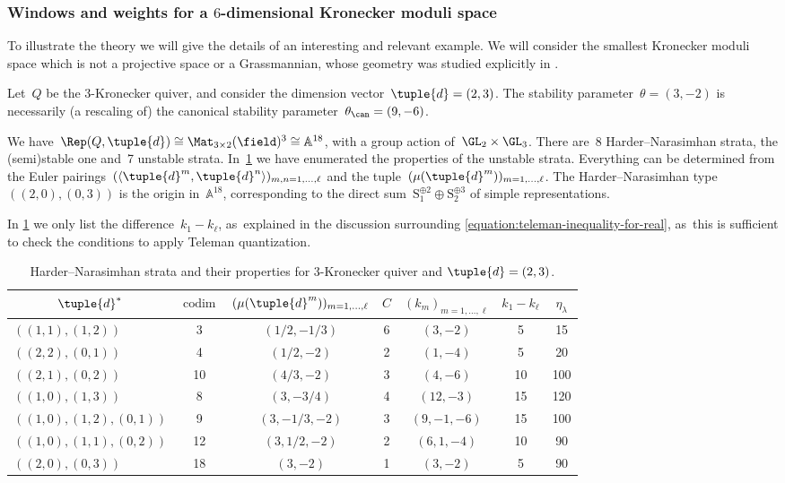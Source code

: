 \subsubsection*{Windows and weights for a $6$-dimensional Kronecker moduli space}
To illustrate the theory we will give the details of an interesting and relevant example.
We will consider the smallest Kronecker moduli space which is not a projective space or a Grassmannian,
whose geometry was studied explicitly in \cite{MR4770368}.
\begin{example}
\label{example:kronecker-moduli-space}
Let~$Q$ be the $3$-Kronecker quiver,
and consider the dimension vector~$\tuple{d}=(2,3)$.
The stability parameter~$\theta=(3,-2)$ is necessarily
(a rescaling of) the canonical stability parameter~$\theta_\can=(9,-6)$.
\end{example}
We have~$\Rep(Q,\tuple{d})\cong\Mat_{3\times 2}(\field)^3\cong\mathbb{A}^{18}$,
with a group action of~$\GL_2\times\GL_3$.
There are~8 Harder--Nara\-sim\-han strata,
the (semi)stable one and~7 unstable strata. In~\cref{table:harder-narasimhan-strata} we have enumerated the properties of the unstable strata.
Everything can be determined from the Euler pairings~$(\langle\tuple{d}^m,\tuple{d}^n\rangle)_{m,n=1,\ldots,\ell}$
and the tuple~$(\mu(\tuple{d}^m))_{m=1,\ldots,\ell}$.
The Harder--Narasimhan type~$((2,0),(0,3))$ is the origin in~$\mathbb{A}^{18}$,
corresponding to the direct sum~$\mathrm{S}_1^{\oplus2}\oplus\mathrm{S}_2^{\oplus3}$ of simple representations.

In \cref{table:harder-narasimhan-strata} we only list the difference~$k_1-k_\ell$, as~explained in the discussion surrounding \eqref{equation:teleman-inequality-for-real}, as~this is sufficient to check the conditions to apply Teleman quantization.

\begin{table}
\centering
\caption{Harder--Narasimhan strata and their properties for 3\protect\nobreakdash-Kro\-necker quiver and $\tuple{d}=(2,3)$.}
\label{table:harder-narasimhan-strata}
\begin{tabular}{lcccccc}
\toprule
\multicolumn{1}{c}{$\tuple{d}^*$} & $\operatorname{codim}$ & $(\mu(\tuple{d}^m))_{m=1,\ldots,\ell}$ & $C$ & $(k_m)_{m=1,\ldots,\ell}$ & $k_1-k_\ell$ & $\eta_\lambda$ \\
\midrule
$((1,1),(1,2))$ & 3 & $(1/2,-1/3)$ & 6 & $(3,-2)$ & 5 & 15 \\
$((2,2),(0,1))$ & 4 & $(1/2,-2)$ & 2 & $(1,-4)$ & 5 & 20 \\
$((2,1),(0,2))$ & 10 & $(4/3,-2)$ & 3 & $(4,-6)$ & 10 & 100 \\
$((1,0),(1,3))$ & 8 & $(3,-3/4)$ & 4 & $(12,-3)$ & 15 & 120 \\
$((1,0),(1,2),(0,1))$ & 9 & $(3,-1/3,-2)$ & 3 & $(9,-1,-6)$ & 15 & 100 \\
$((1,0),(1,1),(0,2))$ & 12 & $(3,1/2,-2)$ & 2 & $(6,1,-4)$ & 10 & 90 \\
$((2,0),(0,3))$ & 18 & $(3,-2)$ & 1 & $(3,-2)$ & 5 & 90 \\
\bottomrule
\end{tabular}
\end{table}

